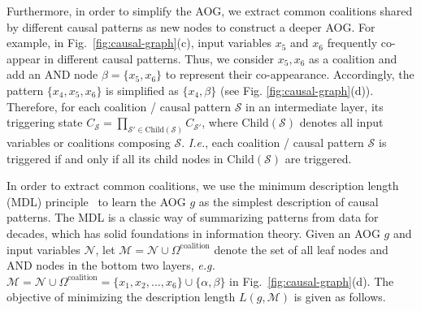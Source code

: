 \documentclass[10pt,twocolumn,letterpaper]{article}
\begin{document}
Furthermore, in order to simplify the AOG, we extract common coalitions shared by different causal patterns as new nodes to construct a deeper AOG.
For example, in Fig.~\ref{fig:causal-graph}(c), input variables {\small $x_5$} and {\small $x_6$} frequently co-appear in different causal patterns.
Thus, we consider {\small $x_5, x_6$} as a coalition and add an AND node {\small $\beta=\{x_5, x_6\}$} to represent their co-appearance.
Accordingly, the pattern {\small $\{x_4, x_5, x_6\}$} is simplified as {\small $\{x_4, \beta\}$} (see Fig. \ref{fig:causal-graph}(d)).
Therefore, for each coalition / causal pattern {\small$\mathcal{S}$} in an intermediate layer, its triggering state {\small$C_{\mathcal{S}}=\prod_{\mathcal{S}'\in\text{Child}(\mathcal{S})}C_{\mathcal{S}'}$}, where {\small$\text{Child}(\mathcal{S})$} denotes all input variables or coalitions composing {\small$\mathcal{S}$}.
\emph{I.e.}, each coalition / causal pattern 
{\small$\mathcal{S}$} is triggered if and only if all its child nodes in {\small$\text{Child}(\mathcal{S})$} are triggered.

In order to extract common coalitions, we use the minimum description length (MDL) principle~\cite{hansen2001model} to learn the AOG {\small$g$} as the simplest description of causal patterns.
The MDL is a classic way of summarizing patterns from data for decades, which has solid foundations in information theory.
Given an AOG $g$ and input variables {\small $\mathcal{N}$}, let {\small $\mathcal{M}\!=\!\mathcal{N}\!\cup\! \Omega^{\text{coalition}}\!$} denote the set of all leaf nodes and AND nodes in the bottom two layers, \emph{e.g.} {\small $\mathcal{M}\!=\!\mathcal{N}\!\cup \!\Omega^{\text{coalition}}\!=\!\{x_1, x_2, ..., x_6\}\!\cup\!\{\alpha, \beta\}$} in Fig.~\ref{fig:causal-graph}(d).
The objective of minimizing the description length {\small$L(g,\mathcal{M})$} is given as follows.
\end{document}
